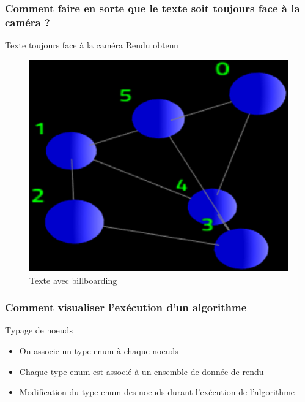 \documentclass[handout]{beamer}
\begin{document}
\begin{frame}
  \frametitle{Comment faire en sorte que le texte soit toujours face à la caméra ?}
  \begin{block}{Texte toujours face à la caméra}
    Rendu obtenu
  \end{block}

  \begin{figure}[ht]
    \begin{center}
      \includegraphics[scale=0.2]{contents/tnode_bb}
    \end{center}
    \caption{Texte avec billboarding}
    \label{fig:tnode_bb}
  \end{figure}
\end{frame}

\begin{frame}
  \frametitle{Comment visualiser l'exécution d'un algorithme}
  \begin{block}{Typage de noeuds}
    \begin{itemize}
    \item On associe un type enum à chaque noeuds
    \item Chaque type enum est associé à un ensemble de donnée de rendu
    \item Modification du type enum des noeuds durant l'exécution de l'algorithme
    \end{itemize}
  \end{block}
\end{frame}
\end{document}
